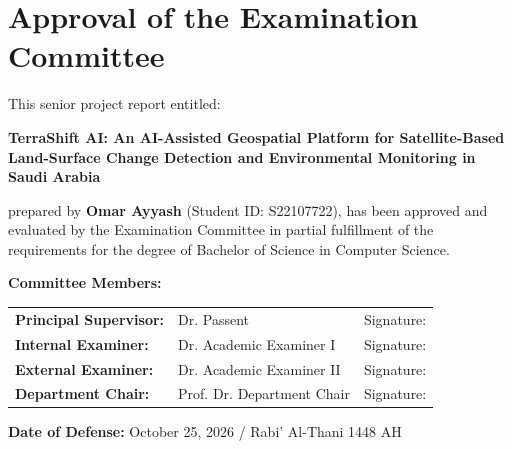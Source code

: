 \chapter*{Approval of the Examination Committee}
\thispagestyle{empty}

This senior project report entitled:
\begin{center}
\textbf{TerraShift AI: An AI-Assisted Geospatial Platform for Satellite-Based Land-Surface Change Detection and Environmental Monitoring in Saudi Arabia}
\end{center}
prepared by \textbf{Omar Ayyash} (Student ID: S22107722), has been approved and evaluated by the Examination Committee in partial fulfillment of the requirements for the degree of Bachelor of Science in Computer Science.

\vspace*{2.0cm}

\noindent
\textbf{Committee Members:}

\vspace*{1.5cm}

\noindent
\begin{tabularx}{\textwidth}{lXl}
\textbf{Principal Supervisor:} & Dr. Passent & Signature: \hrulefill \\[1.2cm]
\textbf{Internal Examiner:}    & Dr. Academic Examiner I      & Signature: \hrulefill \\[1.2cm]
\textbf{External Examiner:}    & Dr. Academic Examiner II     & Signature: \hrulefill \\[1.2cm]
\textbf{Department Chair:}     & Prof. Dr. Department Chair   & Signature: \hrulefill \\
\end{tabularx}

\vspace*{1.5cm}

\noindent
\textbf{Date of Defense:} October 25, 2026 / Rabi' Al-Thani 1448 AH
\newpage
